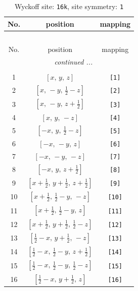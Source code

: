 \documentclass[fleqn,8pt]{jsarticle}
\begin{document}
\begin{longtable}{ccc}
\caption{Wyckoff site: {\tt 16k}, site symmetry: {\tt 1}}
 \\
 \hline \hline
No. & position & mapping \\ \hline \endfirsthead

\multicolumn{2}{l}{\tablename\ \thetable{}} \\
 \hline \hline
No. & position & mapping \\ \hline \endhead

 \hline \hline
\multicolumn{2}{r}{\footnotesize\it continued ...} \\ \endfoot

 \hline \hline
\multicolumn{2}{r}{} \\ \endlastfoot

1 & $\left[ x,\, y,\, z \right]$ & {\tt [1]} \\ \hline
2 & $\left[ x,\, - y,\, \frac{1}{2} - z \right]$ & {\tt [2]} \\ \hline
3 & $\left[ x,\, - y,\, z + \frac{1}{2} \right]$ & {\tt [3]} \\ \hline
4 & $\left[ x,\, y,\, - z \right]$ & {\tt [4]} \\ \hline
5 & $\left[ - x,\, y,\, \frac{1}{2} - z \right]$ & {\tt [5]} \\ \hline
6 & $\left[ - x,\, - y,\, z \right]$ & {\tt [6]} \\ \hline
7 & $\left[ - x,\, - y,\, - z \right]$ & {\tt [7]} \\ \hline
8 & $\left[ - x,\, y,\, z + \frac{1}{2} \right]$ & {\tt [8]} \\ \hline
9 & $\left[ x + \frac{1}{2},\, y + \frac{1}{2},\, z + \frac{1}{2} \right]$ & {\tt [9]} \\ \hline
10 & $\left[ x + \frac{1}{2},\, \frac{1}{2} - y,\, - z \right]$ & {\tt [10]} \\ \hline
11 & $\left[ x + \frac{1}{2},\, \frac{1}{2} - y,\, z \right]$ & {\tt [11]} \\ \hline
12 & $\left[ x + \frac{1}{2},\, y + \frac{1}{2},\, \frac{1}{2} - z \right]$ & {\tt [12]} \\ \hline
13 & $\left[ \frac{1}{2} - x,\, y + \frac{1}{2},\, - z \right]$ & {\tt [13]} \\ \hline
14 & $\left[ \frac{1}{2} - x,\, \frac{1}{2} - y,\, z + \frac{1}{2} \right]$ & {\tt [14]} \\ \hline
15 & $\left[ \frac{1}{2} - x,\, \frac{1}{2} - y,\, \frac{1}{2} - z \right]$ & {\tt [15]} \\ \hline
16 & $\left[ \frac{1}{2} - x,\, y + \frac{1}{2},\, z \right]$ & {\tt [16]} \\
\end{longtable}
\end{document}
